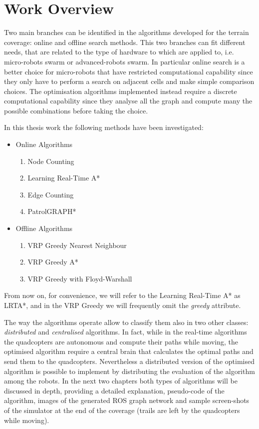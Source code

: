 \chapter{Work Overview}

Two main branches can be identified in the algorithms developed for the terrain coverage: online and offline search methods. This two branches can fit different needs, that are related to the type of hardware to which are applied to, i.e. micro-robots swarm or advanced-robots swarm. In particular online search is a better choice for micro-robots that have restricted computational capability since they only have to perform a search on adjacent cells and make simple comparison choices. The optimisation algorithms implemented instead require a discrete computational capability since they analyse all the graph and compute many the possible combinations before taking the choice.

\noindent In this thesis work the following methods have been investigated:

\begin{itemize}
\item Online Algorithms
	\begin{enumerate}
	\item Node Counting	
	\item Learning Real-Time A*
	\item Edge Counting
	\item PatrolGRAPH*
	\end{enumerate}

\item Offline Algorithms
	\begin{enumerate}
	\item VRP Greedy Nearest Neighbour
	\item VRP Greedy A*
	\item VRP Greedy with Floyd-Warshall
	\end{enumerate}
\end{itemize}
From now on, for convenience, we will refer to the Learning Real-Time A* as LRTA*, and in the VRP Greedy we will frequently omit the \emph{greedy} attribute.

The way the algorithms operate allow to classify them also in two other classes: \emph{distributed} and \emph{centralised} algorithms. In fact, while in the real-time algorithms the quadcopters are autonomous and compute their paths while moving, the optimised algorithm require a central brain that calculates the optimal paths and send them to the quadcopters. Nevertheless a distributed version of the optimised algorithm is possible to implement by distributing the evaluation of the algorithm among the robots.
In the next two chapters both types of algorithms will be discussed in depth, providing a detailed explanation, pseudo-code of the algorithm, images of the generated ROS graph network and sample screen-shots of the simulator at the end of the coverage (trails are left by the quadcopters while moving).

